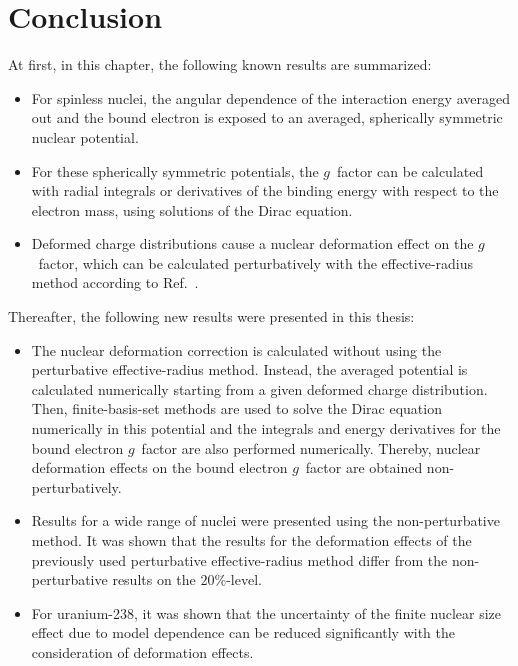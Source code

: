 \section{Conclusion}
At first, in this chapter, the following known results are summarized:
\begin{itemize}
\item For spinless nuclei, the angular dependence of the interaction energy averaged out and the bound electron is exposed to an averaged, spherically symmetric nuclear potential.
\item For these spherically symmetric potentials, the $g$~factor can be calculated with radial integrals or derivatives of the binding energy with respect to the electron mass, using solutions of the Dirac equation.
\item Deformed charge distributions cause a nuclear deformation effect on the $g$~factor, which can be calculated perturbatively with the effective-radius method according to Ref.~\cite{jacek2012}.
\end{itemize}
Thereafter, the following new results were presented in this thesis:
\begin{itemize}
\item The nuclear deformation correction is calculated without using the perturbative effective-radius method. Instead, the averaged potential is calculated numerically starting from a given deformed charge distribution. Then, finite-basis-set methods are used to solve the Dirac equation numerically in this potential and the integrals and energy derivatives for the bound electron $g$~factor are also performed numerically. Thereby, nuclear deformation effects on the bound electron $g$~factor are obtained non-perturbatively.
\item Results for a wide range of nuclei were presented using the non-perturbative method. It was shown that the results for the deformation effects of the previously used perturbative effective-radius method differ from the non-perturbative results on the $20\%$-level.
\item For uranium-238, it was shown that the uncertainty of the finite nuclear size effect due to model dependence can be reduced significantly with the consideration of deformation effects. 
\end{itemize}

